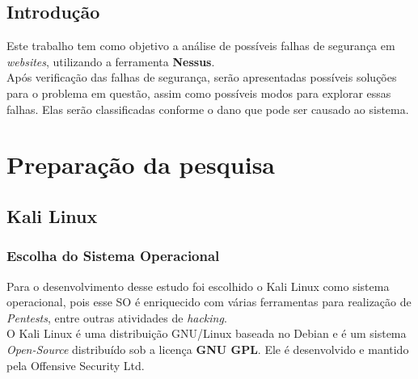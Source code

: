 \documentclass[
	12pt,				%
	openright,			%
	twoside,			%
	a4paper,			%
	english,			%
	french,				%
	spanish,			%
	brazil				%
	]{abntex2}
\begin{document}

\tableofcontents*
\cleardoublepage



\textual

\chapter*[Introdução]{Introdução}

Este trabalho tem como objetivo a análise de possíveis falhas de segurança em \textit{websites}, utilizando a ferramenta \textbf{Nessus}.
\\Após verificação das falhas de segurança, serão apresentadas possíveis soluções para o problema em questão, assim como possíveis modos para explorar essas falhas. Elas serão classificadas conforme o dano que pode ser causado ao sistema.

\part{Preparação da pesquisa}
\chapter{Kali Linux}
\section{Escolha do Sistema Operacional}
Para o desenvolvimento desse estudo foi escolhido o Kali Linux como sistema operacional, pois esse SO é enriquecido com várias ferramentas para realização de \textit{Pentests}, entre outras atividades de \textit{hacking}.
\\O Kali Linux é uma distribuição GNU/Linux baseada no Debian e é um sistema \textit{Open-Source} distribuído sob a licença \textbf{GNU GPL}. Ele é desenvolvido e mantido pela Offensive Security Ltd.
\end{document}
